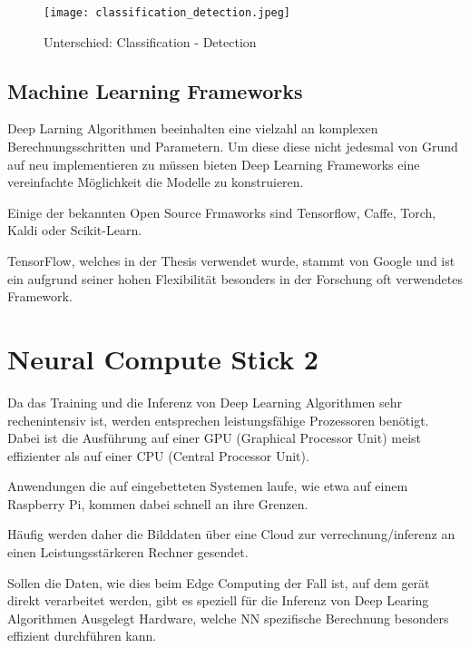 \begin{figure}[H]
    \centering
    \label{fig:class_vs_det}
    \texttt{[image: classification\_detection.jpeg]}
    \caption{Unterschied: Classification - Detection}
\end{figure}


\subsection{Machine Learning Frameworks}

Deep Larning Algorithmen beeinhalten eine vielzahl an komplexen
Berechnungsschritten und Parametern. Um diese diese nicht jedesmal 
von Grund auf neu implementieren zu müssen bieten Deep Learning 
Frameworks eine vereinfachte Möglichkeit die Modelle zu konstruieren.

Einige der bekannten Open Source Frmaworks sind Tensorflow,
Caffe, Torch, Kaldi oder Scikit-Learn.


TensorFlow, welches in der Thesis verwendet wurde, stammt von 
Google und ist ein aufgrund seiner hohen Flexibilität besonders 
in der Forschung oft verwendetes Framework.



\section{Neural Compute Stick 2}\label{ncs2}

Da das Training und die Inferenz von Deep Learning Algorithmen
 sehr rechenintensiv ist, werden entsprechen leistungsfähige 
Prozessoren benötigt. Dabei ist die Ausführung auf einer GPU 
(Graphical Processor Unit) meist effizienter als auf einer 
CPU (Central Processor Unit).

Anwendungen die auf eingebetteten Systemen laufe, wie etwa 
auf einem Raspberry Pi, kommen dabei schnell an ihre 
Grenzen.

Häufig werden daher die Bilddaten über eine Cloud zur 
verrechnung/inferenz an einen Leistungsstärkeren 
Rechner gesendet.

Sollen die Daten, wie dies beim Edge Computing der Fall ist, 
auf dem gerät direkt verarbeitet werden, gibt es speziell 
für die Inferenz von Deep Learing Algorithmen Ausgelegt 
Hardware, welche NN spezifische Berechnung besonders 
effizient durchführen kann.

